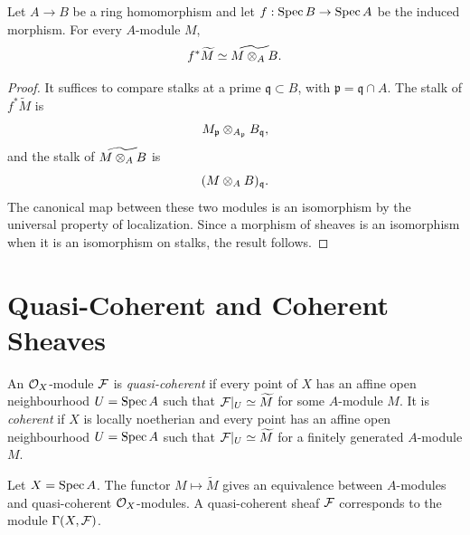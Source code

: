 \begin{proposition}
Let \(A\to B\) be a ring homomorphism and let
\(f:\operatorname{Spec} B\to\operatorname{Spec} A\) be the induced morphism.  For every \(A\)-module \(M\),
\[
    f^*\widetilde M\simeq \widetilde{M\otimes_A B}.
\]
\end{proposition}

\begin{proof}
It suffices to compare stalks at a prime \(\mathfrak q\subset B\), with
\(\mathfrak p=\mathfrak q\cap A\).  The stalk of \(f^*\widetilde M\) is
\[
    M_{\mathfrak p}\otimes_{A_{\mathfrak p}}B_{\mathfrak q},
\]
and the stalk of \(\widetilde{M\otimes_A B}\) is
\[
    (M\otimes_A B)_{\mathfrak q}.
\]
The canonical map between these two modules is an isomorphism by the universal
property of localization.  Since a morphism of sheaves is an isomorphism when
it is an isomorphism on stalks, the result follows.
\end{proof}

\section{Quasi-Coherent and Coherent Sheaves}

\begin{definition}
An \(\mathcal{O}_X\)-module \(\mathcal{F}\) is \emph{quasi-coherent} if every point of \(X\) has
an affine open neighbourhood \(U=\operatorname{Spec} A\) such that
\(\mathcal{F}|_U\simeq\widetilde M\) for some \(A\)-module \(M\).  It is
\emph{coherent} if \(X\) is locally noetherian and every point has an affine
open neighbourhood \(U=\operatorname{Spec} A\) such that
\(\mathcal{F}|_U\simeq\widetilde M\) for a finitely generated \(A\)-module \(M\).
\end{definition}

\begin{theorem}
Let \(X=\operatorname{Spec} A\).  The functor \(M\mapsto\widetilde M\) gives an equivalence
between \(A\)-modules and quasi-coherent \(\mathcal{O}_X\)-modules.  A quasi-coherent
sheaf \(\mathcal{F}\) corresponds to the module \(\Gamma(X,\mathcal{F})\).
\end{theorem}

